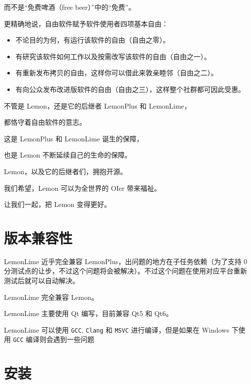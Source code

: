 \documentclass[UTF-8]{ctexart}
\begin{document}
		而不是“免费啤酒（free beer）”中的“免费”。\newline
		
		更精确地说，自由软件赋予软件使用者四项基本自由：
		
		\begin{itemize}
			\item 不论目的为何，有运行该软件的自由（自由之零）。
			\item 有研究该软件如何工作以及按需改写该软件的自由（自由之一）。
			\item 有重新发布拷贝的自由，这样你可以借此来敦亲睦邻（自由之二）。
			\item 有向公众发布改进版软件的自由（自由之三），这样整个社群都可因此受惠。
		\end{itemize}
	
		不管是 Lemon，还是它的后继者 LemonPlus 和 LemonLime，
		
		都恪守着自由软件的意志。
		
		这是 LemonPlus 和 LemonLime 诞生的保障，
		
		也是 Lemon 不断延续自己的生命的保障。\newline
		
		\begin{center}
			
		Lemon，以及它的后继者们，拥抱开源。
		
		我们希望，Lemon 可以为全世界的 OIer 带来福祉。
		
		让我们一起，把 Lemon 变得更好。
		
		\end{center}
	
	\newpage
	
	\section{版本兼容性}
	
		LemonLime 近乎完全兼容 LemonPlus，出问题的地方在子任务依赖（为了支持 0 分测试点的让步，不过这个问题将会被解决）。不过这个问题在使用对应平台重新测试后就可以自动解决。
		
		LemonLime 完全兼容 Lemon。
		
		LemonLime 主要使用 Qt 编写，目前兼容 Qt5 和 Qt6。
		
		LemonLime 可以使用 \texttt{GCC}, \texttt{Clang} 和 \texttt{MSVC} 进行编译，但是如果在 Windows 下使用 \texttt{GCC} 编译则会遇到一些问题
	
	\newpage
	
	\section{安装}
	
\end{document}
